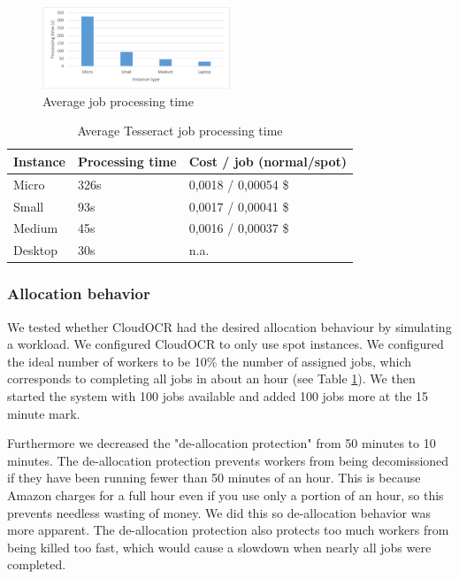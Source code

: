 \documentclass[a4paper]{IEEEtran}
\begin{document}
\begin{figure}
\centering
\includegraphics[width=0.5\textwidth]{"results-tesseract"}
\caption{Average job processing time}
\label{fig_tesperfresults}
\end{figure}

\begin{table}
\caption{Average Tesseract job processing time}
\label{tesperfresults}
\centering
\begin{tabular}{| l | l | l |}
\hline
Instance & Processing time & Cost / job (normal/spot) \\ \hline
Micro & 326s & 0,0018 / 0,00054 \$ \\ \hline
Small & 93s & 0,0017 / 0,00041 \$ \\ \hline
Medium & 45s & 0,0016 / 0,00037 \$ \\ \hline
Desktop & 30s & n.a. \\ \hline
\end{tabular}
\end{table}

\newpage
\subsubsection{Allocation behavior}

We tested whether CloudOCR had the desired allocation behaviour by simulating a workload. We configured CloudOCR to only use spot instances. We configured the ideal number of workers to be 10\% the number of assigned jobs, which corresponds to completing all jobs in about an hour (see Table \ref{tesperfresults}). We then started the system with 100 jobs available and added 100 jobs more at the 15 minute mark.

Furthermore we decreased the "de-allocation protection" from 50 minutes to 10 minutes. The de-allocation protection prevents workers from being decomissioned if they have been running fewer than 50 minutes of an hour. This is because Amazon charges for a full hour even if you use only a portion of an hour, so this prevents needless wasting of money. We did this so de-allocation behavior was more apparent. The de-allocation protection also protects too much workers from being killed too fast, which would cause a slowdown when nearly all jobs were completed.
\end{document}
